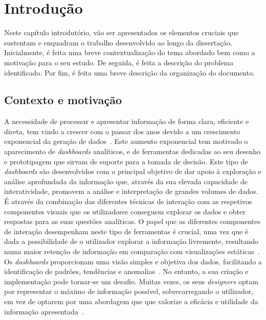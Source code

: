 
%

\chapter{Introdução}
\label{cha:introducao}

Neste capítulo introdutório, vão ser apresentados os elementos cruciais que sustentam e enquadram o trabalho desenvolvido ao longo da dissertação. Inicialmente, é feita uma breve contextualização do tema abordado bem como a motivação para o seu estudo. De seguida, é feita a descrição do problema identificado. Por fim, é feita uma breve descrição da organização do documento.

\section{Contexto e motivação}
\label{sec:cont_e_motiv}

A necessidade de processar e apresentar informação de forma clara, eficiente e direta, tem vindo a crescer com o passar dos anos devido a um crescimento exponencial da geração de dados~\cite{kitchin2014data}. Este aumento exponencial tem motivado o aparecimento de \textit{dashboards} analíticos, e de ferramentas dedicadas ao seu desenho e prototipagem que sirvam de suporte para a tomada de decisão. Este tipo de \textit{dashboards} são desenvolvidos com o principal objetivo de dar apoio à exploração e análise aprofundada da informação que, através da sua elevada capacidade de interatividade, promovem a análise e interpretação de grandes volumes de dados. É através da combinação das diferentes técnicas de interação com as respetivos componentes visuais que os utilizadores conseguem explorar os dados e obter respostas para as suas questões analíticas. O papel que as diferentes componentes de interação desempenham neste tipo de ferramentas é crucial, uma vez que é dada a possibilidade de o utilizador explorar a informação livremente, resultando numa maior retenção de informação em comparação com visualizações estáticas~\cite{brucker2014learning}. Os \textit{dashboards} proporcionam uma visão simples e objetiva dos dados, facilitando a identificação de padrões, tendências e anomalias~\cite{few2006information}. No entanto, a sua criação e implementação pode tornar-se um desafio. Muitas vezes, os seus \textit{designers} optam por representar o máximo de informação possível, sobrecarregando o utilizador, em vez de optarem por uma abordagem que que valorize a eficácia e utilidade da informação apresentada~\cite{eckerson2010performance}.

